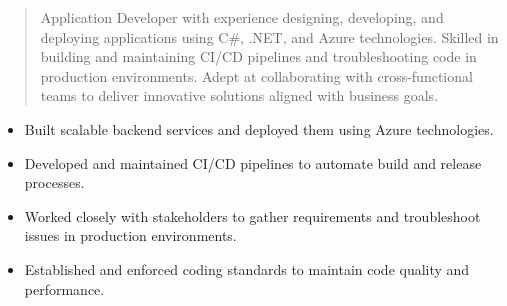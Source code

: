 



\makecvheader

\begin{quote}
  \noindent
  Application Developer with experience designing, developing, and deploying applications using C#, .NET, and Azure technologies. Skilled in building and maintaining CI/CD pipelines and troubleshooting code in production environments. Adept at collaborating with cross-functional teams to deliver innovative solutions aligned with business goals.
\end{quote}

\par\smallskip
\noindent
\begin{minipage}{20cm}
  \begin{minipage}{9.75cm}
    \begin{itemize}
      \item Built scalable backend services and deployed them using Azure technologies.
      \item Developed and maintained CI/CD pipelines to automate build and release processes.
    \end{itemize}
  \end{minipage}
  \hfill
  \begin{minipage}{9.75cm}
    \begin{itemize}
      \item Worked closely with stakeholders to gather requirements and troubleshoot issues in production environments.
      \item Established and enforced coding standards to maintain code quality and performance.
    \end{itemize}
  \end{minipage}
\end{minipage}
\par\smallskip
\divider

